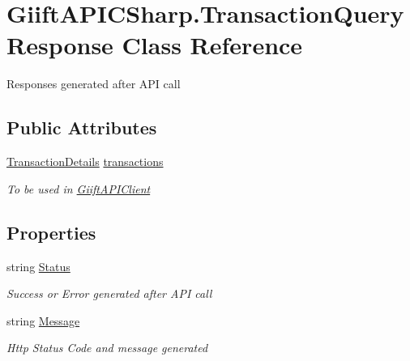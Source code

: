 \hypertarget{class_giift_a_p_i_c_sharp_1_1_transaction_query_response}{}\section{Giift\+A\+P\+I\+C\+Sharp.\+Transaction\+Query\+Response Class Reference}
\label{class_giift_a_p_i_c_sharp_1_1_transaction_query_response}


Responses generated after A\+PI call  


\subsection*{Public Attributes}
\begin{DoxyCompactItemize}
\item 
\hyperlink{class_giift_a_p_i_c_sharp_1_1_transaction_details}{Transaction\+Details} \hyperlink{class_giift_a_p_i_c_sharp_1_1_transaction_query_response_abcaea610eecadc25fbbbee63e7a3a798}{transactions}
\begin{DoxyCompactList}\small\item\em To be used in \hyperlink{class_giift_a_p_i_c_sharp_1_1_giift_a_p_i_client}{Giift\+A\+P\+I\+Client} \end{DoxyCompactList}\end{DoxyCompactItemize}
\subsection*{Properties}
\begin{DoxyCompactItemize}
\item 
string \hyperlink{class_giift_a_p_i_c_sharp_1_1_transaction_query_response_ab312fb4e4842fece2d5221235e51771a}{Status}
\begin{DoxyCompactList}\small\item\em Success or Error generated after A\+PI call \end{DoxyCompactList}\item 
string \hyperlink{class_giift_a_p_i_c_sharp_1_1_transaction_query_response_ab166dba89710342d6591c44ef44aa35b}{Message}
\begin{DoxyCompactList}\small\item\em Http Status Code and message generated \end{DoxyCompactList}\end{DoxyCompactItemize}


